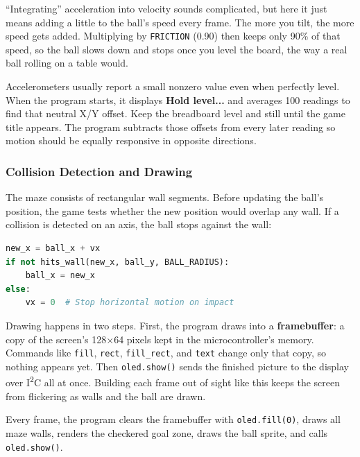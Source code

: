``Integrating'' acceleration into velocity sounds complicated, but here it just means adding a
little to the ball's speed every frame. The more you tilt, the more speed gets added. Multiplying by
\texttt{FRICTION} (0.90) then keeps only 90\% of that speed, so the ball slows down and stops once you
level the board, the way a real ball rolling on a table would.

Accelerometers usually report a small nonzero value even when perfectly level. When the program starts,
it displays \textbf{Hold level...} and averages 100 readings to find that neutral X/Y offset. Keep the
breadboard level and still until the game title appears. The program subtracts those offsets from every
later reading so motion should be equally responsive in opposite directions.

\subsubsection{Collision Detection and Drawing}
The maze consists of rectangular wall segments. Before updating the ball's position, the game tests whether
the new position would overlap any wall. If a collision is detected on an axis, the ball stops against the wall:

\begin{lstlisting}[language=Python, caption=Axis-aligned bounding box collision]
new_x = ball_x + vx
if not hits_wall(new_x, ball_y, BALL_RADIUS):
    ball_x = new_x
else:
    vx = 0  # Stop horizontal motion on impact
\end{lstlisting}

Drawing happens in two steps. First, the program draws into a \textbf{framebuffer}: a copy of the
screen's 128$\times$64 pixels kept in the microcontroller's memory. Commands like \texttt{fill},
\texttt{rect}, \texttt{fill\_rect}, and \texttt{text} change only that copy, so nothing appears yet.
Then \texttt{oled.show()} sends the finished picture to the display over I\textsuperscript{2}C all at
once. Building each frame out of sight like this keeps the screen from flickering as walls and the ball
are drawn.

Every frame, the program clears the framebuffer with \texttt{oled.fill(0)}, draws all maze walls,
renders the checkered goal zone, draws the ball sprite, and calls \texttt{oled.show()}.


